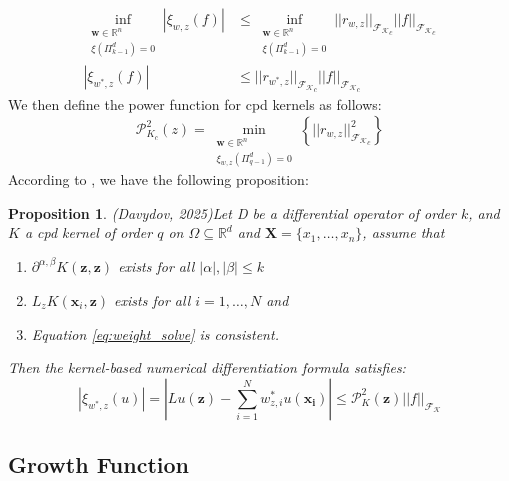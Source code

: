 \documentclass[11pt]{article}
\newtheorem{proposition}{Proposition}
\begin{document}
\begin{align*}
	\inf_{\substack{\bm{w}\in \mathbb{R}^n \\ \xi (\Pi_{k-1}^d) = 0}} |\xi_{w,z}(f)| &\le \inf_{\substack{\bm{w}\in \mathbb{R}^n \\ \xi (\Pi_{k-1}^d) = 0}} ||r_{w,z}||_{\mathcal{F_K}_c} ||f||_{\mathcal{F_K}_c}\\
	|\xi_{w^*,z}(f)| &\le ||r_{w^*,z}||_{\mathcal{F_K}_c} ||f||_{\mathcal{F_K}_c}
\end{align*}
We then define the power function for cpd kernels as follows:
\begin{equation}
\mathcal{P}_{K_c}^2(z) = \min_{\substack{\bm{w} \in \mathbb{R}^n \\ \xi_{w,z} \left(\Pi_{q-1}^d \right) = 0}} \left \{||r_{w,z}||_{\mathcal{F_K}_c}^2 \right \}
\end{equation}
According to \cite{Davydov2025}, we have the following proposition:
\begin{proposition}
(Davydov, 2025)Let D be a differential operator of order $k$, and $K$ a cpd kernel of order $q$ on $\Omega \subseteq \mathbb{R}^d$ and $\bm{X}=\{ x_1, \dots, x_n\}$, assume that
\begin{enumerate}
\item
$\partial^{\alpha,\beta}K(\bm{z},\bm{z})$ exists for all $|\alpha|, |\beta| \le k$
\item
$L_zK(\bm{x}_i,\bm{z})$ exists for all $i=1,\dots,N$ and
\item
Equation \ref{eq:weight_solve} is consistent.
\end{enumerate}
Then the kernel-based numerical differentiation formula  satisfies:
\begin{equation}
\left| \xi_{w^*,z}(u) \right| = \left| Lu(\bm{z}) -\sum_{i=1}^N w_{z,i}^*u(\bm{x_i}) \right| \le \mathcal{P}_{K}^2(\bm{z}) ||f||_\mathcal{F_K}
\end{equation}
\end{proposition}

\subsection{Growth Function}
\end{document}
